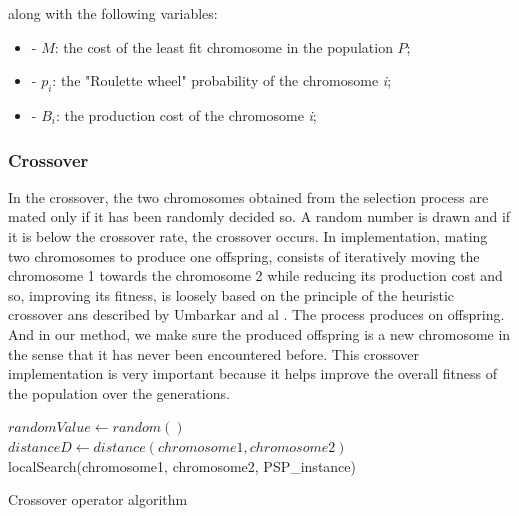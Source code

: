 \documentclass[twocolumn,10pt]{asme2ej}
\begin{document}
along with the following variables: 
\begin{itemize}
    \item - $M$: the cost of the least fit chromosome in the population $P$;
    \item - $p_{i}$: the "Roulette wheel" probability of the chromosome \emph{i};
    \item - $B_{i}$: the production cost of the chromosome \emph{i};
\end{itemize}

\subsubsection{Crossover}

In the crossover, the two chromosomes obtained from the selection process are mated only if it has been randomly decided so. A random number is drawn and if it is below the crossover rate, the crossover occurs. In implementation, mating two chromosomes to produce one offspring, consists of iteratively moving the chromosome 1 towards the chromosome 2 while reducing its production cost and so, improving its fitness, is loosely based on the principle of the heuristic crossover ans described by Umbarkar and al \cite{hCross_paper}. The process produces on offspring. And in our method, we make sure the produced offspring is a new chromosome in the sense that it has never been encountered before. This crossover implementation is very important because it helps improve the overall fitness of the population over the generations. 

\begin{algorithm}[!ht]
\DontPrintSemicolon
    $randomValue \gets random() $\;
    $distanceD \gets distance(chromosome1, chromosome2)$\;
    \Return localSearch(chromosome1, chromosome2, PSP\_instance)

\caption{Crossover operator algorithm}
\label{algo:crossover}
\end{algorithm}
\end{document}
